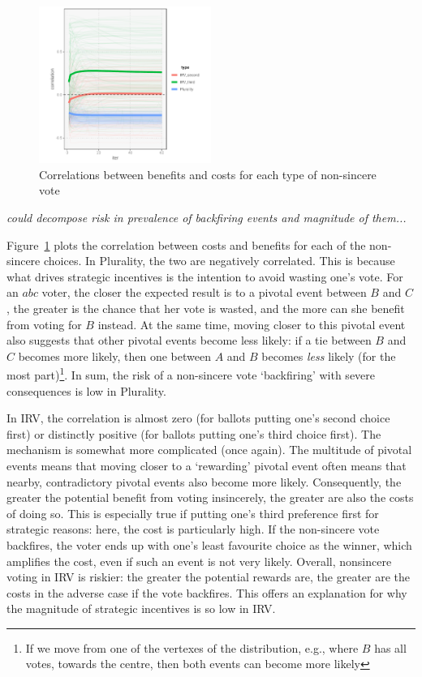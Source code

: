 \documentclass[11pt, letter]{article}
\begin{document}
\begin{figure}[!htb]
	\centering
	\includegraphics[width = 0.5\textwidth]{../output/figures/conj2}
	\caption{Correlations between benefits and costs for each type of non-sincere vote}
	\label{fig:correl}
\end{figure}

\emph{could decompose risk in prevalence of backfiring events and magnitude of them...}

Figure~\ref{fig:correl} plots the correlation between costs and benefits for each of the non-sincere choices. In Plurality, the two are negatively correlated. This is because what drives strategic incentives is the intention to avoid wasting one's vote. For an $abc$ voter, the closer the expected result is to a pivotal event between $B$ and $C$, the greater is the chance that her vote is wasted, and the more can she benefit from voting for $B$ instead. At the same time, moving closer to this pivotal event also suggests that other pivotal events become less likely: if a tie between $B$ and $C$ becomes more likely, then one between $A$ and $B$ becomes \emph{less} likely (for the most part)\footnote{If we move from one of the vertexes of the distribution, e.g., where $B$ has all votes, towards the centre, then both events can become more likely}. In sum, the risk of a non-sincere vote `backfiring' with severe consequences is low in Plurality. 

In IRV, the correlation is almost zero (for ballots putting one's second choice first) or distinctly positive (for ballots putting one's third choice first). The mechanism is somewhat more complicated (once again). The multitude of pivotal events means that moving closer to a `rewarding' pivotal event often means that nearby, contradictory pivotal events also become more likely. Consequently, the greater the potential benefit from voting insincerely, the greater are also the costs of doing so. This is especially true if putting one's third preference first for strategic reasons: here, the cost is particularly high. If the non-sincere vote backfires, the voter ends up with one's least favourite choice as the winner, which amplifies the cost, even if such an event is not very likely. Overall, nonsincere voting in IRV is riskier: the greater the potential rewards are, the greater are the costs in the adverse case if the vote backfires. This offers an explanation for why the magnitude of strategic incentives is so low in IRV.
\end{document}
